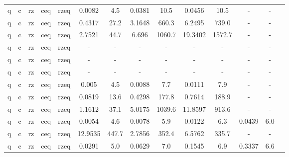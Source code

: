 \begin{table}[htb]
{\begin{tabular}{|c|c|c|c|c|c|c|c|c|c|c|c|c|c|}
q & c & rz & ceq & rzeq & 0.0082 & 4.5 & 0.0381 & 10.5 & 0.0456 & 10.5 & - & - \\ 
q & c & rz & ceq & rzeq & 0.4317 & 27.2 & 3.1648 & 660.3 & 6.2495 & 739.0 & - & - \\ 
q & c & rz & ceq & rzeq & 2.7521 & 44.7 & 6.696 & 1060.7 & 19.3402 & 1572.7 & - & - \\ 
q & c & rz & ceq & rzeq & - & - & - & - & - & - & - & - \\ 
q & c & rz & ceq & rzeq & - & - & - & - & - & - & - & - \\ 
q & c & rz & ceq & rzeq & - & - & - & - & - & - & - & - \\ 
q & c & rz & ceq & rzeq & 0.005 & 4.5 & 0.0088 & 7.7 & 0.0111 & 7.9 & - & - \\ 
q & c & rz & ceq & rzeq & 0.0819 & 13.6 & 0.4298 & 177.8 & 0.7614 & 188.9 & - & - \\ 
q & c & rz & ceq & rzeq & 1.1612 & 37.1 & 5.0175 & 1039.6 & 11.8597 & 913.6 & - & - \\ 
q & c & rz & ceq & rzeq & 0.0054 & 4.6 & 0.0078 & 5.9 & 0.0122 & 6.3 & 0.0439 & 6.0 \\ 
q & c & rz & ceq & rzeq & 12.9535 & 447.7 & 2.7856 & 352.4 & 6.5762 & 335.7 & - & - \\ 
q & c & rz & ceq & rzeq & 0.0291 & 5.0 & 0.0629 & 7.0 & 0.1545 & 6.9 & 0.3337 & 6.6 \\ 
\hline 
\end{tabular}} 
\end{table} 
